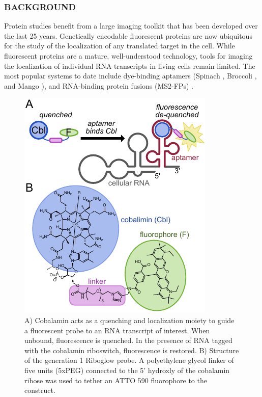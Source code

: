 \subsubsection*{BACKGROUND}
Protein studies benefit from a large imaging toolkit that has been developed over the last 25 years. Genetically encodable fluorescent proteins are now ubiquitous for the study of the localization of any translated target in the cell. While fluorescent proteins are a mature, well-understood technology, tools for imaging the localization of individual RNA transcripts in living cells remain limited. The most popular systems to date include dye-binding aptamers (Spinach \cite{PaigeRNAMimicsGreen2011}, Broccoli \cite{FilonovBroccoliRapidSelection2014}, and Mango \cite{AutourFluorogenicRNAMango2018,DolgosheinaRNAMangoAptamerFluorophore2014}), and RNA-binding protein fusions (MS2-FPs) \cite{FuscoSinglemRNAMolecules2003,TutucciimprovedMS2system2018}.
\begin{figure}
\begin{centering}
\includegraphics[width=\textwidth]{figures/fig1v3.pdf}
\end{centering}
\footnotesize
\caption{\label{figure:riboglow}
A) Cobalamin acts as a quenching and localization moiety to guide a fluorescent probe to an RNA transcript of interest. When unbound, fluorescence is quenched. In the presence of RNA tagged with the cobalamin riboswitch, fluorescence is restored. B) Structure of the generation 1 Riboglow probe. A polyethylene glycol linker of five units (5xPEG) connected to the 5' hydroxly of the cobalamin ribose was used to tether an ATTO 590 fluorophore to the construct.
}
\end{figure}

